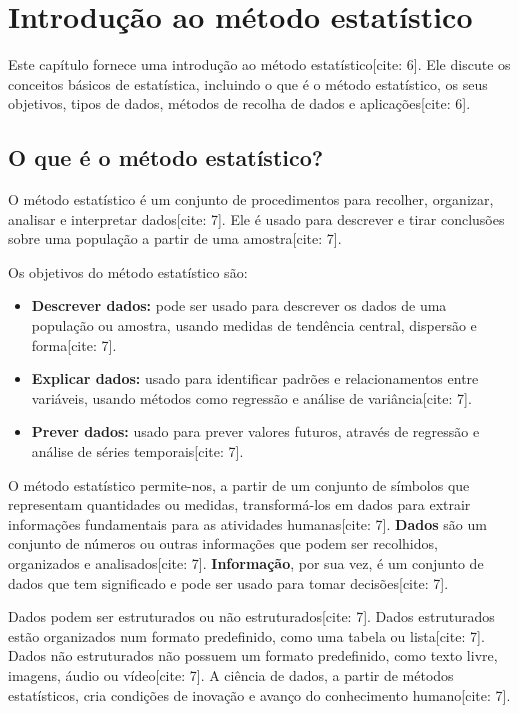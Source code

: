 \documentclass[
  brazilian,
  letterpaper,
  DIV=11,
  numbers=noendperiod]{scrreprt}
\providecommand{\tightlist}{%
  \setlength{\itemsep}{0pt}\setlength{\parskip}{0pt}}
\begin{document}

\chapter{Introdução ao método
estatístico}\label{introduuxe7uxe3o-ao-muxe9todo-estatuxedstico}

Este capítulo fornece uma introdução ao método estatístico{[}cite: 6{]}.
Ele discute os conceitos básicos de estatística, incluindo o que é o
método estatístico, os seus objetivos, tipos de dados, métodos de
recolha de dados e aplicações{[}cite: 6{]}.

\section{O que é o método
estatístico?}\label{o-que-uxe9-o-muxe9todo-estatuxedstico}

O método estatístico é um conjunto de procedimentos para recolher,
organizar, analisar e interpretar dados{[}cite: 7{]}. Ele é usado para
descrever e tirar conclusões sobre uma população a partir de uma
amostra{[}cite: 7{]}.

Os objetivos do método estatístico são:

\begin{itemize}
\tightlist
\item
  \textbf{Descrever dados:} pode ser usado para descrever os dados de
  uma população ou amostra, usando medidas de tendência central,
  dispersão e forma{[}cite: 7{]}.
\item
  \textbf{Explicar dados:} usado para identificar padrões e
  relacionamentos entre variáveis, usando métodos como regressão e
  análise de variância{[}cite: 7{]}.
\item
  \textbf{Prever dados:} usado para prever valores futuros, através de
  regressão e análise de séries temporais{[}cite: 7{]}.
\end{itemize}

O método estatístico permite-nos, a partir de um conjunto de símbolos
que representam quantidades ou medidas, transformá-los em dados para
extrair informações fundamentais para as atividades humanas{[}cite:
7{]}. \textbf{Dados} são um conjunto de números ou outras informações
que podem ser recolhidos, organizados e analisados{[}cite: 7{]}.
\textbf{Informação}, por sua vez, é um conjunto de dados que tem
significado e pode ser usado para tomar decisões{[}cite: 7{]}.

Dados podem ser estruturados ou não estruturados{[}cite: 7{]}. Dados
estruturados estão organizados num formato predefinido, como uma tabela
ou lista{[}cite: 7{]}. Dados não estruturados não possuem um formato
predefinido, como texto livre, imagens, áudio ou vídeo{[}cite: 7{]}. A
ciência de dados, a partir de métodos estatísticos, cria condições de
inovação e avanço do conhecimento humano{[}cite: 7{]}.
\end{document}
